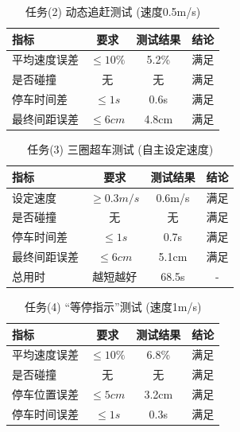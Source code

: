 \documentclass[UTF8]{ctexart}
\begin{document}
\begin{table}[H]
    \centering
    \caption{任务(2) 动态追赶测试 (速度0.5m/s)}
    \begin{tabular}{lccc}
        \toprule
        指标 & 要求 & 测试结果 & 结论 \\
        \midrule
        平均速度误差 & $\le 10\%$ & 5.2\% & 满足 \\
        是否碰撞 & 无 & 无 & 满足 \\
        停车时间差 & $\le 1s$ & 0.6s & 满足 \\
        最终间距误差 & $\le 6cm$ & 4.8cm & 满足 \\
        \bottomrule
    \end{tabular}
\end{table}

\begin{table}[H]
    \centering
    \caption{任务(3) 三圈超车测试 (自主设定速度)}
    \begin{tabular}{lccc}
        \toprule
        指标 & 要求 & 测试结果 & 结论 \\
        \midrule
        设定速度 & $\ge 0.3m/s$ & 0.6m/s & 满足 \\
        是否碰撞 & 无 & 无 & 满足 \\
        停车时间差 & $\le 1s$ & 0.7s & 满足 \\
        最终间距误差 & $\le 6cm$ & 5.1cm & 满足 \\
        总用时 & 越短越好 & 68.5s & - \\
        \bottomrule
    \end{tabular}
\end{table}

\begin{table}[H]
    \centering
    \caption{任务(4) ``等停指示''测试 (速度1m/s)}
    \begin{tabular}{lccc}
        \toprule
        指标 & 要求 & 测试结果 & 结论 \\
        \midrule
        平均速度误差 & $\le 10\%$ & 6.8\% & 满足 \\
        是否碰撞 & 无 & 无 & 满足 \\
        停车位置误差 & $\le 5cm$ & 3.2cm & 满足 \\
        停车时间误差 & $\le 1s$ & 0.3s & 满足 \\
        \bottomrule
    \end{tabular}
\end{table}
\end{document}
